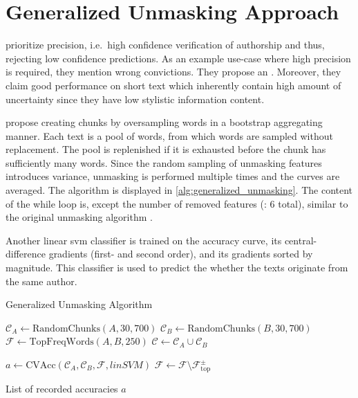 \section{Generalized Unmasking Approach}
\label{sec:generalized_unmasking_approach}

\citet{bevendorff_generalizing_2019} prioritize precision, 
i.e.\ high confidence verification of authorship and thus, rejecting low confidence predictions.
As an example use-case where high precision is required, they mention wrong convictions.
They propose an . %
Moreover, they claim good performance on short text which inherently contain high amount of uncertainty since they have low stylistic information content.

\citet{bevendorff_generalizing_2019,bevendorff_divergence_based_2020} propose creating chunks by 
oversampling words in a bootstrap aggregating manner. 
Each text is a pool of words, from which words are sampled without replacement.
The pool is replenished if it is exhausted before the chunk has sufficiently many words.
Since the random sampling of unmasking features introduces variance, unmasking is performed multiple times and the curves are averaged.
The algorithm is displayed in \autoref{alg:generalized_unmasking}.
The content of the while loop is, except the number of removed features (\citep{koppel_authorship_2004}: 6 total), 
similar to the original unmasking algorithm \citep{koppel_authorship_2004}.

Another linear \ac{svm} classifier is trained on the accuracy curve, its central-difference gradients (first- and second order), 
and its gradients sorted by magnitude.
This classifier is used to predict the whether the texts originate from the same author.

\begin{algorithm}
    \caption{Generalized Unmasking Algorithm \citep{bevendorff_generalizing_2019,bevendorff_divergence_based_2020}}
    \label{alg:generalized_unmasking}
    \begin{algorithmic}[1]
    
        \State $\mathcal{C}_A \gets \text{RandomChunks}(A, 30, 700)$ 
        \State $\mathcal{C}_B \gets \text{RandomChunks}(B, 30, 700)$
        \State $\mathcal{F} \gets \text{TopFreqWords}(A, B, 250)$
        \State $\mathcal{C} \gets \mathcal{C}_A \cup \mathcal{C}_B$

        
        \State $a \gets \text{CVAcc}(\mathcal{C}_A, \mathcal{C}_B, \mathcal{F}, linSVM)$ 
        \State $\mathcal{F} \gets \mathcal{F} \setminus \mathcal{F}_{\text{top}}^{\pm}$ 
    
        \EndWhile
    
        \State \Return List of recorded accuracies $a$
    \EndProcedure
    \end{algorithmic}
\end{algorithm}

